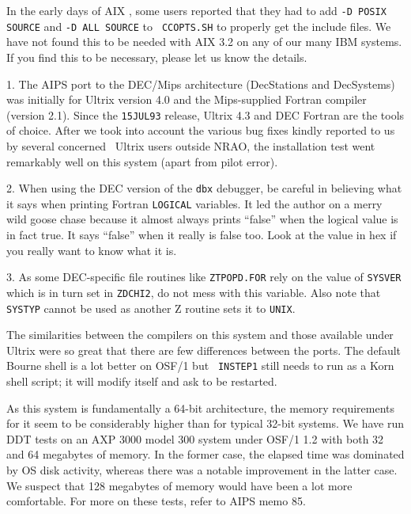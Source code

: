 {{In the early days of AIX \AIPS, some users reported that they
had to add {\tt -D POSIX SOURCE} and {\tt -D ALL SOURCE} to {\tt
CCOPTS.SH} to properly get the include files.  We have not found this to
be needed with AIX 3.2 on any of our many IBM systems.  If you find this
to be necessary, please let us know the details.

\medskip


\item {1.} The AIPS port to the DEC/Mips architecture (DecStations and
DecSystems) was initially for Ultrix version 4.0 and the Mips-supplied
Fortran compiler (version 2.1).  Since the {\tt 15JUL93} release,
Ultrix 4.3 and DEC Fortran are the tools of choice.  After we took into
account the various bug fixes kindly reported to us by several concerned
\AIPS\ Ultrix users outside NRAO, the installation test went remarkably
well on this system (apart from pilot error).

\item{2.} When using the DEC version of the {\tt dbx} debugger, be
careful in believing what it says when printing Fortran {\tt LOGICAL}
variables.  It led the author on a merry wild goose chase because it
almost always prints ``false'' when the logical value is in fact true.
It says ``false'' when it really is false too.  Look at the value in hex
if you really want to know what it is. \medskip

\item{3.} As some DEC-specific file routines like {\tt ZTPOPD.FOR} rely
on the value of {\tt SYSVER} which is in turn set in {\tt ZDCHI2}, do
not mess with this variable.  Also note that {\tt SYSTYP} cannot be used
as another Z routine sets it to {\tt UNIX}. \medskip


The similarities between the compilers on this system and those available
under Ultrix were so great that there are few differences between the
ports.  The default Bourne shell is a lot better on OSF/1 but {\tt
INSTEP1} still needs to run as a Korn shell script; it will modify itself
and ask to be restarted.

As this system is fundamentally a 64-bit architecture, the memory
requirements for it seem to be considerably higher than for typical 32-bit
systems.  We have run DDT tests on an AXP 3000 model 300 system under
OSF/1 1.2 with both 32 and 64 megabytes of memory.  In the former case,
the elapsed time was dominated by OS disk activity, whereas there was a
notable improvement in the latter case.  We suspect that 128 megabytes of
memory would have been a lot more comfortable.  For more on these tests,
refer to AIPS memo 85.

}}

